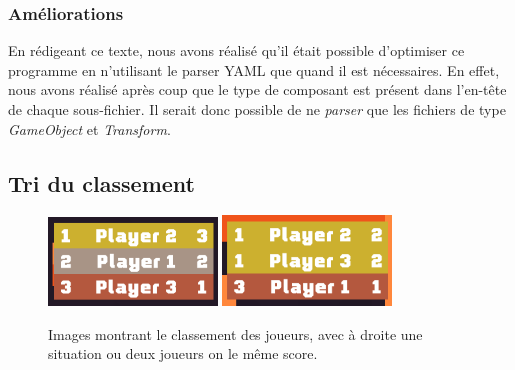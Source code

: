 \documentclass[a4paper]{article}
\begin{document}
\subsubsection{Améliorations}
En rédigeant ce texte, nous avons réalisé qu'il était possible d'optimiser ce programme en n'utilisant le parser YAML que quand il est nécessaires. En effet, nous avons réalisé après coup que le type de composant est présent dans l'en-tête de chaque sous-fichier. Il serait donc possible de ne \textit{parser} que les fichiers de type \textit{GameObject} et \textit{Transform}.

\subsection{Tri du classement}
\begin{figure}[H]
	\centering
    \includegraphics[width=0.4\textwidth]{images/game/leaderboard1.png}
    \includegraphics[width=0.4\textwidth]{images/game/leaderboard2.png}
    \caption{Images montrant le classement des joueurs, avec à droite une situation ou deux joueurs on le même score.}
    \label{fig:leaderboard}
\end{figure}
\end{document}
